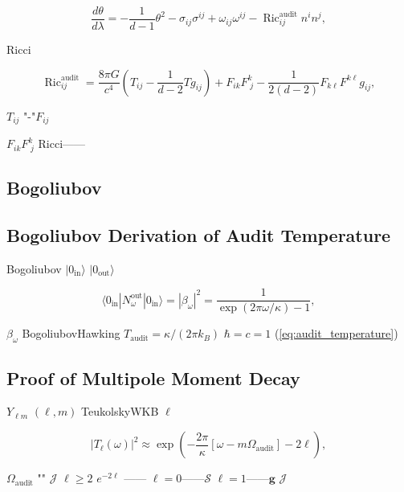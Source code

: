 \documentclass[12pt,a4paper]{article}
\theoremstyle{remark}
\newcommand{\g}{\mathbf{g}}
\DeclareMathOperator{\Ric}{Ric}
\newcommand{\cG}{G}          %
\newcommand{\cC}{c}          %
\newcommand{\cK}{\kappa}     %
\newcommand{\cH}{\hbar}      %
\begin{document}
\begin{equation}
    \frac{d\theta}{d\lambda} = -\frac{1}{d-1}\theta^2 - \sigma_{ij}\sigma^{ij} + \omega_{ij}\omega^{ij} - \Ric_{ij}^{\mathrm{audit}} n^i n^j,
\end{equation}

Ricci

\begin{equation}
    \Ric_{ij}^{\mathrm{audit}} = \frac{8\pi\cG}{\cC^4}\left(T_{ij} - \frac{1}{d-2}Tg_{ij}\right) + F_{ik}F^{k}_{\;j} - \frac{1}{2(d-2)}F_{k\ell}F^{k\ell}g_{ij},
\end{equation}

 $T_{ij}$ "-"$F_{ij}$ 

$F_{ik}F^{k}_{\;j}$ Ricci——

\subsection{Bogoliubov}
\subsection{Bogoliubov Derivation of Audit Temperature}

Bogoliubov $|0_{\mathrm{in}}\rangle$  $|0_{\mathrm{out}}\rangle$ 

\begin{equation}
    \langle 0_{\mathrm{in}}| N_{\omega}^{\mathrm{out}} |0_{\mathrm{in}}\rangle = |\beta_{\omega}|^2 = \frac{1}{\exp(2\pi\omega/\cK) - 1},
\end{equation}

 $\beta_{\omega}$ BogoliubovHawking $T_{\mathrm{audit}} = \cK/(2\pi k_B)$ $\cH = \cC = 1$  (\ref{eq:audit_temperature})

\subsection{}
\subsection{Proof of Multipole Moment Decay}

 $Y_{\ell m}$ $(\ell, m)$ TeukolskyWKB $\ell$ 

\begin{equation}
    |T_\ell(\omega)|^2 \approx \exp\left(-\frac{2\pi}{\cK}\left[\omega - m\Omega_{\mathrm{audit}}\right] - 2\ell\right),
\end{equation}

 $\Omega_{\mathrm{audit}}$ "" $\mathcal{J}$  $\ell \geq 2$ $e^{-2\ell}$ —— $\ell = 0$——$\mathcal{S}$ $\ell = 1$——$\g$  $\mathcal{J}$
\end{document}
